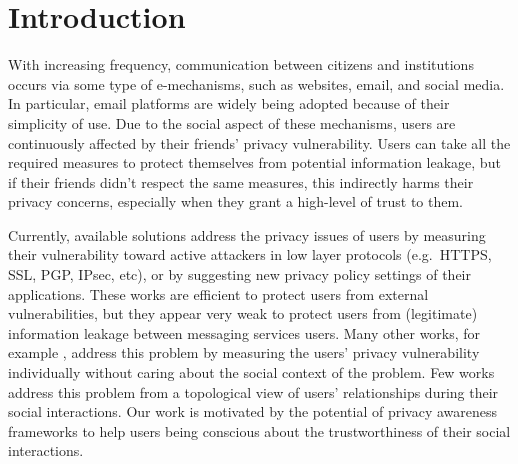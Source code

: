 \section{Introduction} \label{sec:Introduction}

With increasing frequency,
	communication between citizens and institutions occurs via some type of e-mechanisms,
	such as websites,
	email,
	and social media.
In particular,
	email platforms are widely being adopted because of their simplicity of use.
Due to the social aspect of these mechanisms,
	users are continuously affected by their friends' privacy vulnerability.
Users can take all the required measures to protect themselves from potential information leakage,
	but if their friends didn't respect the same measures,
	this indirectly harms their privacy concerns,
	especially when they grant a high-level of trust to them.

Currently,
	available solutions address the privacy issues of users by measuring their vulnerability toward active attackers in low layer protocols (e.g.~HTTPS,
	SSL,
	PGP,
	IPsec,
	etc),
	or by suggesting new privacy policy settings of their applications.
These works are efficient to protect users from external vulnerabilities, but they appear very weak to protect users from (legitimate) information leakage between messaging services users.
Many other works, for example \cite{liu_framework_2010}, address this problem by measuring the users' privacy vulnerability individually without caring about the social context of the problem.
Few works \cite{zeng_trustaware_2014} \cite{b.s._privacy_2015} address this problem from a topological view of users' relationships during their social interactions.
Our work is motivated by the potential of privacy awareness frameworks to help users being conscious about the trustworthiness of their social interactions.

